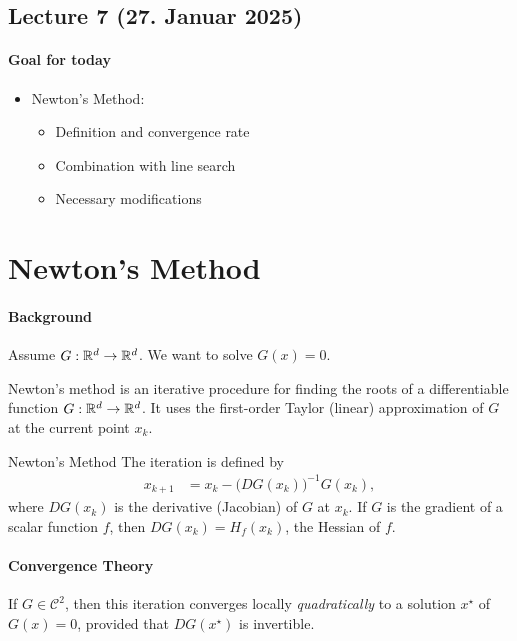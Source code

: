 \subsection{Lecture 7 (27. Januar 2025)}

\paragraph{Goal for today}
\begin{itemize}
    \item Newton's Method:
    \begin{itemize}
        \item Definition and convergence rate
        \item Combination with line search
        \item Necessary modifications
    \end{itemize}
\end{itemize}

\section*{Newton's Method}

\paragraph{Background}
Assume \(G: \mathbb{R}^d \to \mathbb{R}^d\). We want to solve \(G(x) = 0\).

Newton's method is an iterative procedure for finding the roots of a differentiable function \(G: \mathbb{R}^d \to \mathbb{R}^d\). 
It uses the first-order Taylor (linear) approximation of \(G\) at the current point \(x_k\).

\begin{definition}{Newton's Method}{}
    The iteration is defined by
    \begin{align*}
        x_{k+1} &= x_k - \bigl(D G(x_k)\bigr)^{-1} G(x_k),
    \end{align*}
    where \(D G(x_k)\) is the derivative (Jacobian) of \(G\) at \(x_k\). If \(G\) is the gradient of a scalar function \(f\), then \(DG(x_k) = H_f(x_k)\), the Hessian of \(f\).
\end{definition}

\paragraph{Convergence Theory}
If \(G\in \mathcal{C}^2\), then this iteration converges locally \emph{quadratically} to 
a solution \(x^\star\) of \(G(x) = 0\), provided that \(D G(x^\star)\) is invertible.


